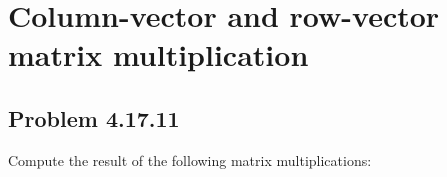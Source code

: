 \documentclass[
  letterpaper,
  DIV=11,
  numbers=noendperiod]{scrartcl}
\author{}
\date{}
\renewcommand*\contentsname{Table of contents}
\newcommand\contentsname{Table of contents}
\begin{document}

\newpage

\ifdefined\Shaded\renewenvironment{Shaded}{\begin{tcolorbox}[sharp corners, borderline west={3pt}{0pt}{shadecolor}, interior hidden, enhanced, breakable, boxrule=0pt, frame hidden]}{\end{tcolorbox}}\fi

\renewcommand*\contentsname{Table of contents}
{
\hypersetup{linkcolor=}
\setcounter{tocdepth}{4}
\tableofcontents
}
\newpage{}

\hypertarget{column-vector-and-row-vector-matrix-multiplication}{%
\section{Column-vector and row-vector matrix
multiplication}\label{column-vector-and-row-vector-matrix-multiplication}}

\hypertarget{problem-4.17.11}{%
\subsection{Problem 4.17.11}\label{problem-4.17.11}}

Compute the result of the following matrix multiplications:
\end{document}
